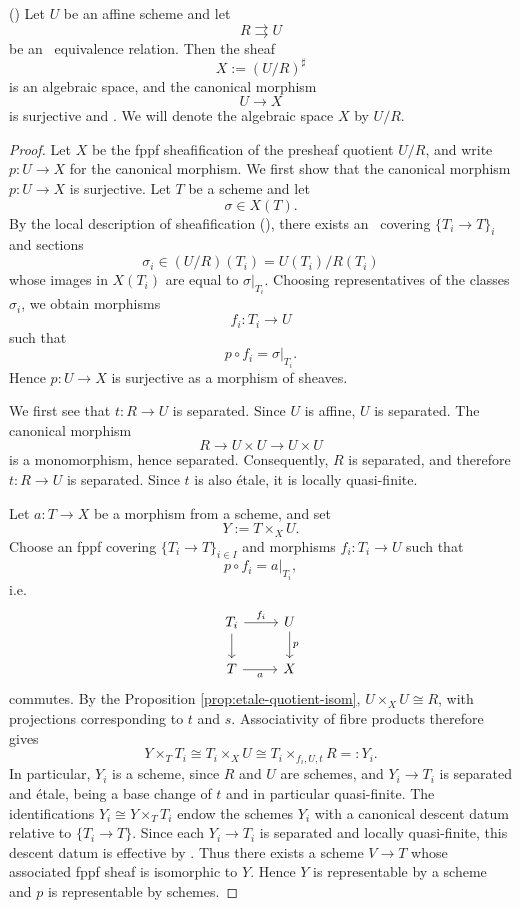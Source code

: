 \begin{lemma}\label{lem:quotient-by-etale-eq}
	(\cite[Tag 0265]{stacks-project})
	Let $U$ be an affine scheme and let
	\[
	R \rightrightarrows U
	\]
	be an \etale\ equivalence relation. Then the sheaf
	\[
	X:=(U/R)^\sharp
	\]
	is an algebraic space, and the canonical morphism
	\[
	U\to X
	\]
	is surjective and \etale.
	We will denote the algebraic space $X$ by $U/R$.
\end{lemma}


\begin{proof}
	Let $X$ be the fppf sheafification of the presheaf quotient
	$U/R$, and write $p:U\to X$ for the canonical morphism.
	We first show that the canonical morphism $p:U\to X$ is surjective. Let $T$ be a scheme and let
	\[
	\sigma\in X(T).
	\]
	By the local description of sheafification (\cite[][Tag 00WK]{stacks-project}), there exists an \etale\ covering $\{T_i\to T\}_i$ and sections
	\[
	\sigma_i\in (U/R)(T_i)=U(T_i)/R(T_i)
	\]
	whose images in $X(T_i)$ are equal to $\sigma|_{T_i}$. Choosing representatives of the classes $\sigma_i$, we obtain morphisms
	\[
	f_i:T_i\to U
	\]
	such that
	\[
	p\circ f_i=\sigma|_{T_i}.
	\]
	Hence $p:U\to X$ is surjective as a morphism of sheaves.
	
	We first see that $t:R\to U$ is separated. Since $U$ is affine, $U$ is separated. The canonical morphism
	\[
	R \longrightarrow U\times U
	\longrightarrow
	U\times U
	\]
	is a monomorphism, hence separated. Consequently, $R$
	is separated, and therefore
	$t:R\to U$ is separated. Since $t$ is also étale, it is
	locally quasi-finite.
	
	Let $a:T\to X$ be a morphism from a scheme, and set
	\[
	Y:=T\times_X U.
	\]
	Choose an fppf covering $\{T_i\to T\}_{i\in I}$ and
	morphisms $f_i:T_i\to U$ such that
	\[
	p\circ f_i=a|_{T_i},
	\]
	i.e. 
	\[\begin{tikzcd}
		{T_i} & U \\
		T & X
		\arrow["{f_i}", from=1-1, to=1-2]
		\arrow[from=1-1, to=2-1]
		\arrow["p", from=1-2, to=2-2]
		\arrow["a"', from=2-1, to=2-2]
	\end{tikzcd}\]
	commutes. By the Proposition \ref{prop:etale-quotient-isom}, $U\times_X U\cong R$,
	with projections corresponding to $t$ and $s$.
	Associativity of fibre products therefore gives
	\[
	Y\times_T T_i
	\cong T_i\times_X U
	\cong T_i\times_{f_i,U,t}R
	=:Y_i.
	\]
	In particular, $Y_i$ is a scheme, since $R$ and $U$ are schemes, and $Y_i\to T_i$
	is separated and étale, being a base change of $t$ and in particular quasi-finite.
	The identifications $Y_i\cong Y\times_T T_i$ endow the
	schemes $Y_i$ with a canonical descent datum relative
	to $\{T_i\to T\}$. Since each $Y_i\to T_i$ is separated
	and locally quasi-finite, this descent datum is effective
	by \cite[Lemma 37.57.1]{stacks-project}.
	Thus there exists a scheme $V\to T$ whose associated
	fppf sheaf is isomorphic to $Y$.
	Hence $Y$ is representable by a scheme and $p$ is representable by schemes.
	

\end{proof}
